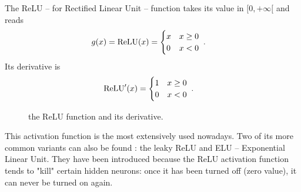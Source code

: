 The ReLU -- for Rectified Linear Unit -- function takes its value in $[0,+\infty[$ and reads
\begin{align}
g(x)&={\rm ReLU}(x)=\begin{cases}
      x & x\geq 0 \\
      0& x<0
   \end{cases}\;.
\end{align}
Its derivative is
\begin{align}
{\rm ReLU}'(x)&=\begin{cases}
      1 & x\geq 0 \\
      0 & x<0
   \end{cases}\;.
\end{align}

\begin{figure}[H]
\begin{center}
\end{center}
\caption{\label{fig:relu} the ReLU function and its derivative.}
\end{figure}


This activation function is the most extensively used nowadays. Two of its more common variants can also be found : the leaky ReLU and ELU -- Exponential Linear Unit. They have been introduced because the ReLU activation function tends to "kill" certain hidden neurons: once it has been turned off (zero value), it can never be turned on again.



